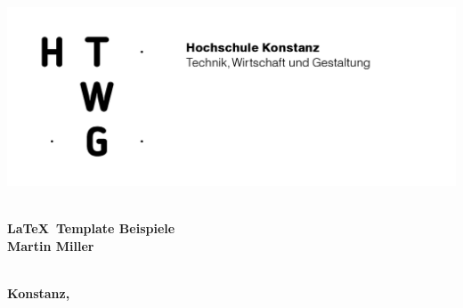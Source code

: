 \documentclass[SSS_Laborbericht.tex]{subfiles}
\begin{document}
\begin{titlepage}

\vspace*{-3.5cm}

\begin{flushleft}
\hspace*{-1cm} \includegraphics[width=15.7cm]{preface/htwg-logo}
\end{flushleft}

\vspace{1cm}

\begin{center}
	\large{
		\textbf{\strLecture} \\[2cm]
	}
	\Huge{
		\textbf{\LaTeX ~Template Beispiele} \\[2cm]
	}
	\Large{
		\textbf{Martin Miller}} \\[3cm]
	\large{
		\textbf{} \\[2.3cm]
	}
	
	\large{
		\textbf{Konstanz, \strDate}
	}
\end{center}

\end{titlepage}
\thispagestyle{empty}



%
%
\tableofcontents

%
%
{}
\listoffigures
\thispagestyle{preface}
\newpage

%
%
{}
\listoftables
\thispagestyle{preface}
\newpage

%
%
\renewcommand\lstlistingname{Listing}
\renewcommand\lstlistlistingname{Listingverzeichnis}
\lstlistoflistings
{}
\thispagestyle{preface}
\newpage

%
%

\end{document}
